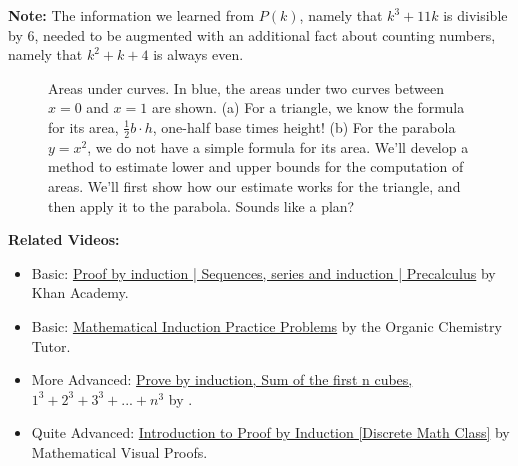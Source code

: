  \textbf{Note:} The information we learned from $P(k)$, namely that $k^3 + 11 k$ is divisible by $6$, needed to be augmented with an additional fact about counting numbers, namely that $ k^2 + k + 4$ is always even.

 \Qed
 
 \bigskip

   
    \begin{figure}[htb]%
\centering
{}%
\hspace{5pt}%
%
    \caption[]{Areas under curves. In blue, the areas under two curves between $x=0$ and $x=1$ are shown. (a) For a triangle, we know the formula for its area, $\frac{1}{2}b \cdot h$, one-half base times height! (b) For the parabola $y=x^2$, we do not have a simple formula for its area. We'll develop a method to estimate lower and upper bounds for the computation of areas. We'll first show how our estimate works for the triangle, and then apply it to the parabola. Sounds like a plan?}
    \label{fig:InitialAreasTriangleParapbola}
\end{figure}

\bigskip
\textbf{Related Videos:}
\begin{itemize}
    \item Basic: \href{https://www.youtube.com/watch?v=wblW_M_HVQ8}{Proof by induction | Sequences, series and induction | Precalculus} by Khan Academy.
    \item Basic: \href{https://www.youtube.com/watch?v=tHNVX3e9zd0}{Mathematical Induction Practice Problems} by the Organic Chemistry Tutor.
    \item More Advanced: \href{https://www.youtube.com/watch?v=w362XRZy5as}{Prove by induction, Sum of the first n cubes, $1^3+2^3+3^3+...+n^3$} by \bprp.
    \item Quite Advanced: \href{https://www.youtube.com/watch?v=OI-nSvpZTpE}{Introduction to Proof by Induction [Discrete Math Class]} by Mathematical Visual Proofs.
\end{itemize}




